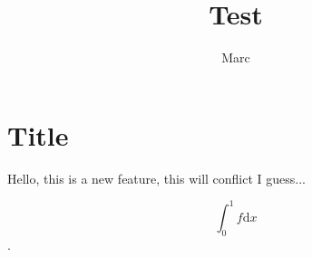 \documentclass{article}
\begin{document}
\author{Marc}
\title{Test}
\maketitle

\section{Title}
\label{sec:title}
Hello, this is a new feature, this will conflict I guess... 


$$ \int_0^1 f \mathrm{d}x $$.
\end{document}
